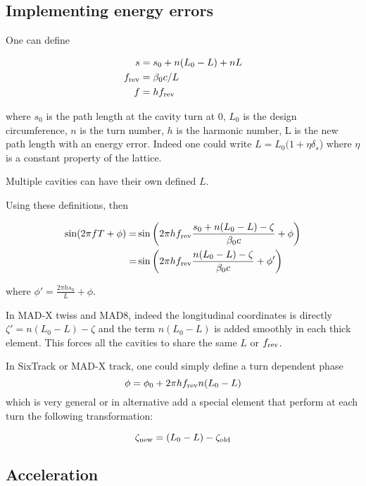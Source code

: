 \subsection{Implementing energy errors} 

One can define

\begin{equation}
\begin{aligned}
s &= s_0 + n (L_0-L) + n L\\
f_{\rm rev} &= \beta_0 c / L\\ 
f &= h f_{\rm rev}
\end{aligned}
\end{equation}

where $s_0$ is the path length at the cavity turn at 0, $L_0$ is the design circumference, $n$ is the turn number, $h$ is the harmonic number, L is the new path length with an energy error. Indeed one could write $L=L_0(1 +\eta \delta_s$) where $\eta$ is a constant property of the lattice.

Multiple cavities can have their own defined $L$.

Using these definitions, then


\begin{align}
\sin(2 \pi f T + \phi) =
&\sin\left(2 \pi h f_{\rm rev} \frac{s_0 + n(L_0-L) -\zeta}{\beta_0 c}  + \phi\right)\\
=&\sin\left(2 \pi h f_{\rm rev} \frac{n(L_0-L) -\zeta}{\beta_0 c}  + \phi'\right)
\end{align}


where $\phi'=\frac{2\pi h s_0}{L} + \phi$.


In MAD-X twiss and MAD8, indeed the longitudinal coordinates is directly $\zeta'=n(L_0-L) -\zeta$ and the term $n(L_0-L)$ is added smoothly in each thick element. This forces all the cavities to share the same $L$ or $f_{\rm rev}$.

In SixTrack or MAD-X track, one could simply define a turn dependent phase
\begin{equation}
\phi=\phi_0 + 2 \pi h f_{\rm rev} n(L_0-L)
\end{equation}
which is very general or in alternative add a special element that perform at each turn the following transformation:

\begin{equation}
\zeta_{\rm new}=(L_0-L) -\zeta_{\rm old} 
\end{equation}

\subsection{Acceleration}

